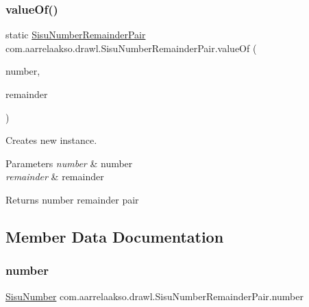 \subsubsection{\texorpdfstring{value\+Of()}{valueOf()}}
{\footnotesize\ttfamily static \hyperlink{classcom_1_1aarrelaakso_1_1drawl_1_1_sisu_number_remainder_pair}{Sisu\+Number\+Remainder\+Pair} com.\+aarrelaakso.\+drawl.\+Sisu\+Number\+Remainder\+Pair.\+value\+Of (\begin{DoxyParamCaption}\item[{final \hyperlink{classcom_1_1aarrelaakso_1_1drawl_1_1_sisu_number}{Sisu\+Number}}]{number,  }\item[{final \hyperlink{classcom_1_1aarrelaakso_1_1drawl_1_1_sisu_number}{Sisu\+Number}}]{remainder }\end{DoxyParamCaption})\hspace{0.3cm}{\ttfamily [static]}}



Creates new instance. 


\begin{DoxyParams}{Parameters}
{\em number} & number \\
\hline
{\em remainder} & remainder \\
\hline
\end{DoxyParams}
\begin{DoxyReturn}{Returns}
number remainder pair 
\end{DoxyReturn}


\subsection{Member Data Documentation}
\mbox{\label{classcom_1_1aarrelaakso_1_1drawl_1_1_sisu_number_remainder_pair_a7ff7c95e41cb9dfbccb419fc75d05706}} 
\subsubsection{\texorpdfstring{number}{number}}
{\footnotesize\ttfamily \hyperlink{classcom_1_1aarrelaakso_1_1drawl_1_1_sisu_number}{Sisu\+Number} com.\+aarrelaakso.\+drawl.\+Sisu\+Number\+Remainder\+Pair.\+number\hspace{0.3cm}{\ttfamily [private]}}




